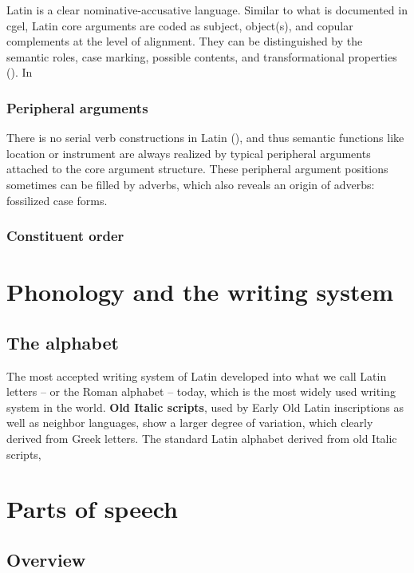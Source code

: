 \documentclass[a4paper, oneside]{report}
\newcommand*{\concept}[1]{\textbf{#1}}
\begin{document}
Latin is a clear nominative-accusative language.
Similar to what is documented in \acs{cgel},
Latin core arguments are coded as subject, object(s),
and copular complements at the level of alignment.
They can be distinguished by the semantic roles,
case marking, possible contents, and transformational properties 
().
In 

\subsection{Peripheral arguments}

There is no serial verb constructions in Latin (),
and thus semantic functions like location or instrument 
are always realized by typical peripheral arguments
attached to the core argument structure.
These peripheral argument positions sometimes can be filled by adverbs,
which also reveals an origin of adverbs: fossilized case forms.

\subsection{Constituent order}\label{sec:constituent-order-abs}



\chapter{Phonology and the writing system}

\section{The alphabet}

The most accepted writing system of Latin developed into 
what we call Latin letters -- or the Roman alphabet -- today, 
which is the most widely used writing system in the world.
\concept{Old Italic scripts},
used by Early Old Latin inscriptions 
as well as neighbor languages,
show a larger degree of variation, 
which clearly derived from Greek letters.
The standard Latin alphabet derived from old Italic scripts, 


\chapter{Parts of speech}\label{chap:pos}

\section{Overview}
\end{document}
